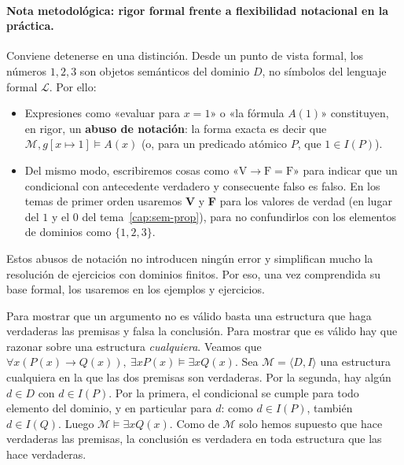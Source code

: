 \begin{ejemplo}
\paragraph{Nota metodológica: rigor formal frente a flexibilidad notacional en la práctica.}
Conviene detenerse en una distinción. Desde un punto de vista formal, los números $1, 2, 3$ son objetos semánticos del dominio $D$, no símbolos del lenguaje formal $\mathcal{L}$. Por ello:
\begin{itemize}
    \item Expresiones como «evaluar para $x = 1$» o «la fórmula $A(1)$» constituyen, en rigor, un \textbf{abuso de notación}: la forma exacta es decir que $\mathcal{M}, g[x \mapsto 1] \models A(x)$ (o, para un predicado atómico $P$, que $1 \in I(P)$).
    \item Del mismo modo, escribiremos cosas como «$\text{V} \to \text{F} = \text{F}$» para indicar que un condicional con antecedente verdadero y consecuente falso es falso. En los temas de primer orden usaremos \textbf{V} y \textbf{F} para los valores de verdad (en lugar del $1$ y el $0$ del tema~\ref{cap:sem-prop}), para no confundirlos con los elementos de dominios como $\{1, 2, 3\}$.
\end{itemize}
Estos abusos de notación no introducen ningún error y simplifican mucho la resolución de ejercicios con dominios finitos. Por eso, una vez comprendida su base formal, los usaremos en los ejemplos y ejercicios.
\end{ejemplo}

\begin{ejemplo}
Para mostrar que un argumento no es válido basta una estructura que haga verdaderas las premisas y falsa la conclusión. Para mostrar que es válido hay que razonar sobre una estructura \emph{cualquiera}. Veamos que $\forall x (P(x) \to Q(x)), \ \exists x P(x) \models \exists x Q(x)$. Sea $\mathcal{M} = \langle D, I \rangle$ una estructura cualquiera en la que las dos premisas son verdaderas. Por la segunda, hay algún $d \in D$ con $d \in I(P)$. Por la primera, el condicional se cumple para todo elemento del dominio, y en particular para $d$: como $d \in I(P)$, también $d \in I(Q)$. Luego $\mathcal{M} \models \exists x Q(x)$. Como de $\mathcal{M}$ solo hemos supuesto que hace verdaderas las premisas, la conclusión es verdadera en toda estructura que las hace verdaderas.
\end{ejemplo}


